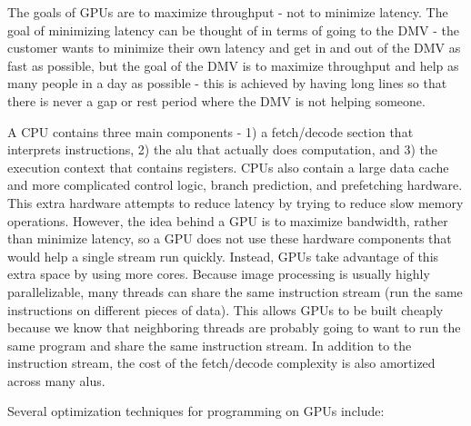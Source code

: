 \documentclass[10pt]{article}
\begin{document}
\begin{flushleft}
The goals of GPUs are to maximize throughput - not to minimize latency. The goal of minimizing latency can be thought of in terms of going to the DMV - the customer wants to minimize their own latency and get in and out of the DMV as fast as possible, but the goal of the DMV is to maximize throughput and help as many people in a day as possible - this is achieved by having long lines so that there is never a gap or rest period where the DMV is not helping someone. 

A CPU contains three main components - 1) a fetch/decode section that interprets instructions, 2) the \gls{alu} that actually does computation, and 3) the execution context that contains registers. CPUs also contain a large data cache and more complicated control logic, branch prediction, and prefetching hardware. This extra hardware attempts to reduce latency by trying to reduce slow memory operations. However, the idea behind a GPU is to maximize bandwidth, rather than minimize latency, so a GPU does not use these hardware components that would help a single stream run quickly. Instead, GPUs take advantage of this extra space by using more cores. Because image processing is usually highly parallelizable, many threads can share the same instruction stream (run the same instructions on different pieces of data). This allows GPUs to be built cheaply because we know that neighboring threads are probably going to want to run the same program and share the same instruction stream. In addition to the instruction stream, the cost of the fetch/decode complexity is also amortized across many \gls{alu}s. 

Several optimization techniques for programming on GPUs include:


\end{flushleft}
\end{document}
